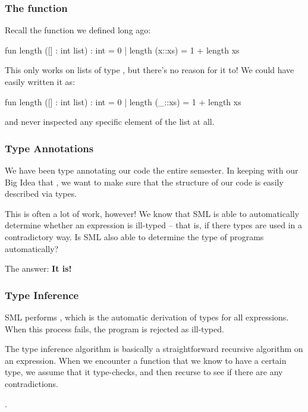 \documentclass[aspectratio=169, handout]{beamer}
\begin{document}
\begin{frame}[fragile]
  \frametitle{The  function}

  Recall the  function we defined long ago:

  \pause
  \begin{codeblock}
    fun length ([] : int list) : int = 0 
      | length (x::xs) = 1 + length xs
  \end{codeblock}

  \pause
  \vspace{\fill}

  This only works on lists of type , but there's no reason for it
  to! We could have easily written it as:

  \pause
  \begin{codeblock}
    fun length ([] : int list) : int = 0 
      | length (_::xs) = 1 + length xs
  \end{codeblock}

  and never inspected any specific element of the list at all.
\end{frame}

\begin{frame}[fragile]
  \frametitle{Type Annotations}

  \tgs

  We have been type annotating our code the entire semester. In keeping with
  our Big Idea that , we want to make sure that 
  the structure of our code is easily described via types.

  \pause
  \vspace{\fill}
  
  This is often a lot of work, however! We know that SML is able to automatically 
  determine whether an expression is ill-typed -- that is, if there types are 
  used in a contradictory way. Is SML also able to determine the type of programs
  automatically?

  \pause
  \vspace{\fill}

  The answer: \textbf{It is!}
\end{frame}

\begin{frame}[fragile]
  \frametitle{Type Inference}

  SML performs , which is the automatic derivation of
  types for all expressions. When this process fails, the program is rejected
  as ill-typed.\footnotemark

  \pause
  \vspace{\fill}

  The type inference algorithm is basically a straightforward recursive 
  algorithm on an expression. When we encounter a function that we know to have
  a certain type, we assume that it type-checks, and then recurse to see
  if there are any contradictions. 

  .
\end{frame}
\end{document}
